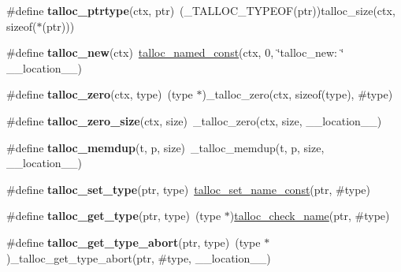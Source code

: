 \begin{DoxyCompactItemize}
\item 
\hypertarget{group__talloc_ga701fcfe911d22322568edb930746874e}{}\#define {\bfseries talloc\+\_\+ptrtype}(ctx,  ptr)~(\+\_\+\+T\+A\+L\+L\+O\+C\+\_\+\+T\+Y\+P\+E\+O\+F(ptr))talloc\+\_\+size(ctx, sizeof($\ast$(ptr)))\label{group__talloc_ga701fcfe911d22322568edb930746874e}

\item 
\hypertarget{group__talloc_gadb84ffe9387a259e0b1cf8245747f032}{}\#define {\bfseries talloc\+\_\+new}(ctx)~\hyperlink{group__talloc_ga72dc3f21af6c125c71221860c5d9fd36}{talloc\+\_\+named\+\_\+const}(ctx, 0, \char`\"{}talloc\+\_\+new\+: \char`\"{} \+\_\+\+\_\+location\+\_\+\+\_\+)\label{group__talloc_gadb84ffe9387a259e0b1cf8245747f032}

\item 
\hypertarget{group__talloc_gadc8a378dcb3147841371c03e4dbb3cfe}{}\#define {\bfseries talloc\+\_\+zero}(ctx,  type)~(type $\ast$)\+\_\+talloc\+\_\+zero(ctx, sizeof(type), \#type)\label{group__talloc_gadc8a378dcb3147841371c03e4dbb3cfe}

\item 
\hypertarget{group__talloc_ga4463b5c9d6c20e4e9c42927aecfd3d7c}{}\#define {\bfseries talloc\+\_\+zero\+\_\+size}(ctx,  size)~\+\_\+talloc\+\_\+zero(ctx, size, \+\_\+\+\_\+location\+\_\+\+\_\+)\label{group__talloc_ga4463b5c9d6c20e4e9c42927aecfd3d7c}

\item 
\hypertarget{group__talloc_ga95ef753d2eabbd539e80ed92879ecbf4}{}\#define {\bfseries talloc\+\_\+memdup}(t,  p,  size)~\+\_\+talloc\+\_\+memdup(t, p, size, \+\_\+\+\_\+location\+\_\+\+\_\+)\label{group__talloc_ga95ef753d2eabbd539e80ed92879ecbf4}

\item 
\hypertarget{group__talloc_ga750c1ae3fea2c84670a2e4962f319b35}{}\#define {\bfseries talloc\+\_\+set\+\_\+type}(ptr,  type)~\hyperlink{group__talloc_ga204ed205d6b1524c46f12541d5eca686}{talloc\+\_\+set\+\_\+name\+\_\+const}(ptr, \#type)\label{group__talloc_ga750c1ae3fea2c84670a2e4962f319b35}

\item 
\hypertarget{group__talloc_gaf96938ad0d47dd54da843b4db8154dbc}{}\#define {\bfseries talloc\+\_\+get\+\_\+type}(ptr,  type)~(type $\ast$)\hyperlink{group__talloc_ga1f4f10b2b41c13879fd30cdb30b50862}{talloc\+\_\+check\+\_\+name}(ptr, \#type)\label{group__talloc_gaf96938ad0d47dd54da843b4db8154dbc}

\item 
\hypertarget{group__talloc_ga67d5dbe930855dad7e41b55812784892}{}\#define {\bfseries talloc\+\_\+get\+\_\+type\+\_\+abort}(ptr,  type)~(type $\ast$)\+\_\+talloc\+\_\+get\+\_\+type\+\_\+abort(ptr, \#type, \+\_\+\+\_\+location\+\_\+\+\_\+)\label{group__talloc_ga67d5dbe930855dad7e41b55812784892}


\end{DoxyCompactItemize}
